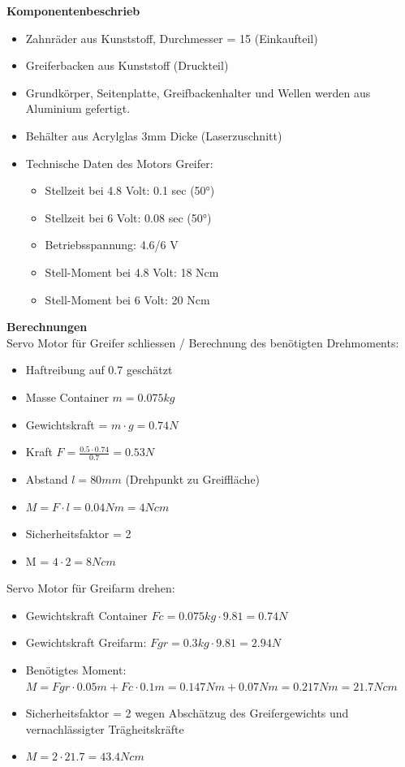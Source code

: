 \textbf{Komponentenbeschrieb}\\[0.2cm]
\begin{itemize}
\item Zahnräder aus Kunststoff, Durchmesser = 15 (Einkaufteil)
\item Greiferbacken aus Kunststoff (Druckteil)
\item Grundkörper, Seitenplatte, Greifbackenhalter und Wellen werden aus Aluminium gefertigt.
\item Behälter aus Acrylglas 3mm Dicke (Laserzuschnitt)
\item Technische Daten des Motors Greifer:
\begin{itemize}
\item Stellzeit bei 4.8 Volt: 0.1 sec (50°) 
\item Stellzeit bei 6 Volt: 0.08 sec (50°) 
\item Betriebsspannung: 4.6/6 V
\item Stell-Moment bei 4.8 Volt: 18 Ncm
\item Stell-Moment bei 6 Volt: 20 Ncm 
\end{itemize}
\end{itemize}
\textbf{Berechnungen}\\[0.2cm]
Servo Motor für Greifer schliessen /
Berechnung des benötigten Drehmoments: 
\begin{itemize}
\item Haftreibung auf 0.7 geschätzt
\item Masse Container $m = 0.075kg$
\item Gewichtskraft = $m\cdot g = 0.74 N$
\item Kraft $F = \frac{0.5\cdot 0.74}{0.7} = 0.53 N$
\item Abstand $l = 80mm$ (Drehpunkt zu Greiffläche)
\item $M = F\cdot l = 0.04 Nm = 4 Ncm$
\item Sicherheitsfaktor = 2
\item M = $4\cdot 2 = 8 Ncm$
\end{itemize}
Servo Motor für Greifarm drehen:
\begin{itemize}
\item Gewichtskraft Container $Fc = 0.075kg\cdot 9.81 = 0.74 N$
\item Gewichtskraft Greifarm: $Fgr = 0.3kg\cdot 9.81 = 2.94 N$
\item Benötigtes Moment:
$M = Fgr\cdot 0.05m+Fc\cdot 0.1m = 0.147Nm+0.07Nm = 0.217Nm = 21.7Ncm$
\item Sicherheitsfaktor = 2 wegen Abschätzug des Greifergewichts und vernachlässigter Trägheitskräfte
\item $M = 2 \cdot 21.7 = 43.4 Ncm$
\end{itemize}
